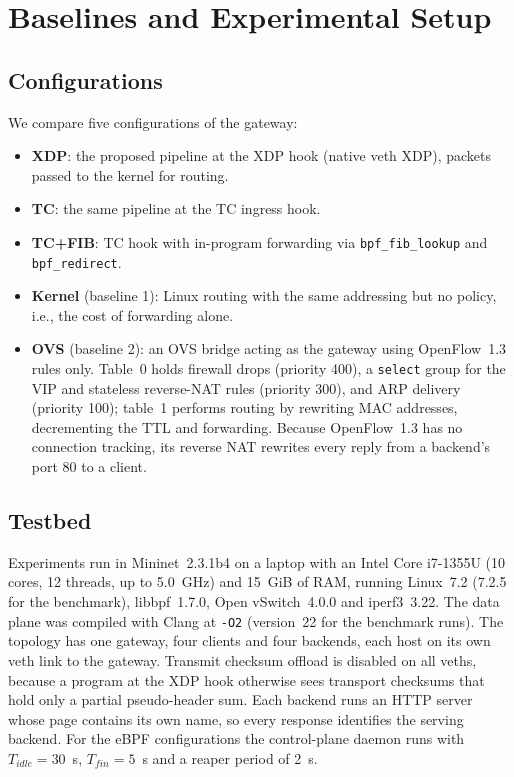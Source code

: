 \documentclass[conference]{IEEEtran}
\begin{document}
\section{Baselines and Experimental Setup}
\label{sec:setup}
\subsection{Configurations}
We compare five configurations of the gateway:
\begin{itemize}
\item \textbf{XDP}: the proposed pipeline at the XDP hook (native veth XDP),
packets passed to the kernel for routing.
\item \textbf{TC}: the same pipeline at the TC ingress hook.
\item \textbf{TC+FIB}: TC hook with in-program forwarding via
\texttt{bpf\_fib\_lookup} and \texttt{bpf\_redirect}.
\item \textbf{Kernel} (baseline 1): Linux routing with the same addressing
but no policy, i.e., the cost of forwarding alone.
\item \textbf{OVS} (baseline 2): an OVS bridge acting as the gateway using
OpenFlow~1.3 rules only. Table~0 holds firewall drops (priority 400), a
\texttt{select} group for the VIP and stateless reverse-NAT rules
(priority 300), and ARP delivery (priority 100); table~1 performs routing by
rewriting MAC addresses, decrementing the TTL and forwarding. Because
OpenFlow~1.3 has no connection tracking, its reverse NAT rewrites every
reply from a backend's port 80 to a client.
\end{itemize}

\subsection{Testbed}
Experiments run in Mininet~2.3.1b4 \cite{lantz2010mininet} on a laptop with an
Intel Core i7-1355U (10 cores, 12 threads, up to 5.0~GHz) and 15~GiB of RAM,
running Linux~7.2 (7.2.5 for the benchmark), libbpf~1.7.0, Open vSwitch~4.0.0
and iperf3~3.22. The data plane was compiled with Clang at \texttt{-O2}
(version~22 for the benchmark runs). The topology has one gateway, four clients and four backends,
each host on its own veth link to the gateway. Transmit checksum offload is
disabled on all veths, because a program at the XDP hook otherwise sees
transport checksums that hold only a partial pseudo-header sum. Each backend
runs an HTTP server whose page contains its own name, so every response
identifies the serving backend. For the eBPF configurations the control-plane
daemon runs with $T_{idle}=30$~s, $T_{fin}=5$~s and a reaper period of 2~s.
\end{document}
